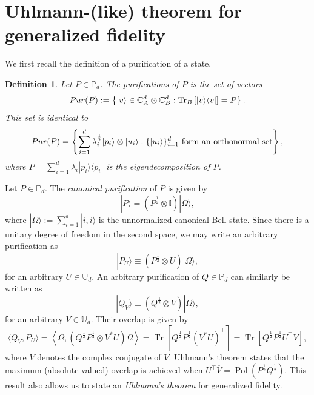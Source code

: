 \documentclass[12pt]{article}
\newtheorem{definition}[theorem]{Definition}
\theoremstyle{definition}
\begin{document}
\section{Uhlmann-(like) theorem for generalized fidelity } \label{Sec:UhlmannTheorem}

We first recall the definition of a purification of a state.

\begin{definitionbox}
    \begin{definition}
Let $P \in \mathbb P_d$. The \emph{purifications} of $P$ is the set of vectors
\begin{equation}
\emph{Pur}(P) := \left\{ |v\rangle \in \mathbb{C}^d_A \otimes \mathbb{C}^d_B : \operatorname{Tr}_B \left[ |v\rangle\langle v| \right] = P \right\}.
\end{equation}
This set is identical to
\begin{equation}
\emph{Pur}(P) = \left\{ \sum_{i=1}^d \lambda_i^{\frac 12} |p_i\rangle \otimes |u_i\rangle : \{ |u_i\rangle \}_{i=1}^d \text{ form an orthonormal set} \right\},
\end{equation}
where $P = \sum_{i=1}^d \lambda_i |p_i\rangle \langle p_i|$ is the eigendecomposition of $P$.
\end{definition}
\end{definitionbox}

Let $P \in \mathbb P_d$. The \textit{canonical purification} of $P$ is given by
\begin{equation}
|P\rangle = (P^{\frac12}   \otimes \mathbb I) |\Omega \rangle ,
\end{equation}
where $|\Omega\rangle := \sum_{i=1}^{d} |i, i\rangle  $ is the unnormalized canonical Bell state. Since there is a unitary degree of freedom in the second space, we may write an arbitrary purification as
\begin{equation}
|P_U\rangle \equiv \left(P^{\frac12}   \otimes U\right) |\Omega \rangle ,
\end{equation}
for an arbitrary $U \in \mathbb U_d$. An arbitrary purification of $Q \in \mathbb P_d$ can similarly be written as
\begin{equation}
|Q_V\rangle \equiv \left(Q^{\frac12}  \otimes V\right) |\Omega \rangle ,
\end{equation}
for an arbitrary $V \in \mathbb U_d$. Their overlap is given by
\begin{equation}
\langle Q_V , P_U \rangle = \left\langle \Omega , \left(Q^{\frac12}  P^{\frac12}   \otimes V^* U\right) \Omega \right\rangle = \operatorname{Tr}\left[Q^{\frac12}  P^{\frac12}   (V^*U)^\top\right] = \operatorname{Tr}\left[Q^{\frac12}  P^{\frac12}   U^\top \overline{V} \right],
\end{equation}
where $\overline{V}$ denotes the complex conjugate of $V$. Uhlmann's theorem states that the maximum (absolute-valued) overlap is achieved when $U^\top \overline{V} = \operatorname{Pol}\left(P^{\frac 12} Q^{\frac 12}\right)$. This result also allows us to state an \emph{Uhlmann's theorem} for generalized fidelity.
\end{document}
